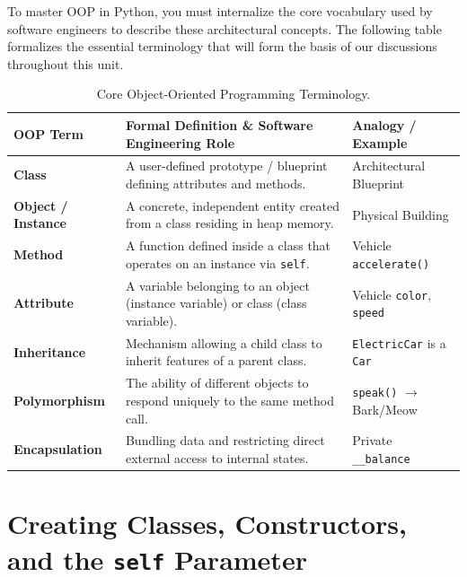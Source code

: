 To master OOP in Python, you must internalize the core vocabulary used by software engineers to describe these architectural concepts. The following table formalizes the essential terminology that will form the basis of our discussions throughout this unit.

\begin{table}[htbp]
\centering
\small
\renewcommand{\arraystretch}{1.3}
\begin{tabularx}{\linewidth}{l>{\raggedright\arraybackslash}Xl}
\toprule
\textbf{OOP Term} & \textbf{Formal Definition \& Software Engineering Role} & \textbf{Analogy / Example} \\
\midrule
\textbf{Class} & A user-defined prototype / blueprint defining attributes and methods. & Architectural Blueprint \\
\textbf{Object / Instance} & A concrete, independent entity created from a class residing in heap memory. & Physical Building \\
\textbf{Method} & A function defined inside a class that operates on an instance via \texttt{self}. & Vehicle \texttt{accelerate()} \\
\textbf{Attribute} & A variable belonging to an object (instance variable) or class (class variable). & Vehicle \texttt{color}, \texttt{speed} \\
\textbf{Inheritance} & Mechanism allowing a child class to inherit features of a parent class. & \texttt{ElectricCar} is a \texttt{Car} \\
\textbf{Polymorphism} & The ability of different objects to respond uniquely to the same method call. & \texttt{speak()} $\to$ Bark/Meow \\
\textbf{Encapsulation} & Bundling data and restricting direct external access to internal states. & Private \texttt{\_\_balance} \\
\bottomrule
\end{tabularx}
\caption{Core Object-Oriented Programming Terminology.}
\label{tab:oop-terms}
\end{table}

\section{Creating Classes, Constructors, and the \texttt{self} Parameter}


